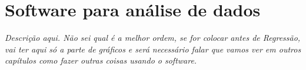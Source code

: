 \chapter{Software para análise de dados}
\label{Chap:SoftwareDados}

\begin{fullwidth}
{\it
Descrição aqui. Não sei qual é a melhor ordem, se for colocar antes de Regressão, vai ter aqui só a parte de gráficos e será necessário falar que vamos ver em outros capítulos como fazer outras coisas usando o software.
}
\end{fullwidth}
